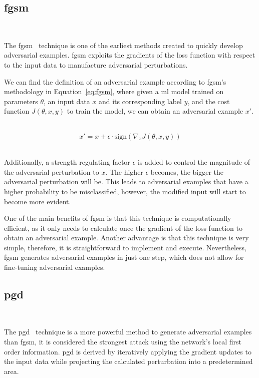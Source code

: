 \subsection{\acl{fgsm}}\label{subsection:fgsm} \

The \ac{fgsm}~\cite{goodfellow_explaining_2015} technique is one
of the earliest methods created to quickly develop adversarial
examples. \ac{fgsm} exploits the gradients of the loss function
with respect to the input data to manufacture adversarial
perturbations. \

We can find the definition of an adversarial example according
to \ac{fgsm}'s methodology in Equation~\ref*{eq:fgsm}, where given
a \ac{ml} model trained on parameters \(\theta\), an input data \(x\)
and its corresponding label \(y\), and the cost function 
\( J(\theta, x, y) \) to train the model, we can obtain
an adversarial example \(x'\). \

\begin{equation}\label{eq:fgsm}
  x' = x + \epsilon \cdot \text{sign}(\nabla_x J(\theta, x, y))
\end{equation} \

Additionally, a strength regulating factor \(\epsilon\) is added
to control the magnitude of the adversarial perturbation to \(x\).
The higher \(\epsilon\) becomes, the bigger the adversarial
perturbation will be. This leads to adversarial examples that have
a higher probability to be misclassified, however, the modified
input will start to become more evident. \

One of the main benefits of \ac{fgsm} is that this technique
is computationally efficient, as it only needs to calculate
once the gradient of the loss function to obtain an adversarial
example. Another advantage is that this technique is very simple,
therefore, it is straightforward to implement and execute.
Nevertheless, \ac{fgsm} generates adversarial examples in just
one step, which does not allow for fine-tuning adversarial
examples. \

\subsection{\acl{pgd}}\label{subsection:pgd} \

The \ac{pgd}~\cite{madry_towards_2019} technique is a more
powerful method to generate adversarial examples than \ac{fgsm},
it is considered the strongest attack using the network's local
first order information. \ac{pgd} is derived by iteratively
applying the gradient updates to the input data while projecting
the calculated perturbation into a predetermined area. \

